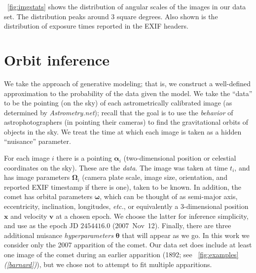 \documentclass[12pt,preprint]{aastex}
\newcommand{\project}[1]{\textsl{#1}}
\newcommand{\An}{\project{Astrometry.net}}
\newcommand{\foreign}[1]{\emph{#1}}
\newcommand{\etc}{\foreign{etc.}}
\newcommand{\figref}[1]{\figurename~\ref{#1}}
\newcommand{\paramvector}[1]{\boldsymbol{#1}}
\newcommand{\pointing}{\paramvector{\alpha}}
\newcommand{\fovpars}{\paramvector{\Omega}}
\newcommand{\orbitpars}{\paramvector{\omega}}
\newcommand{\hyperpars}{\paramvector{\theta}}
\newcommand{\position}{\paramvector{x}}
\newcommand{\velocity}{\paramvector{v}}
\newcommand{\tlabel}[1]{\textsl{({#1})}}
\begin{document}
\figref{fig:imgstats} shows the distribution of angular scales
of the images in our data set.  The distribution peaks around $3$
square degrees.  Also shown is the distribution of exposure times
reported in the EXIF headers.

\section{Orbit inference}

We take the approach of generative modeling; that is, we construct a
well-defined approximation to the probability of the data given the
model.  We take the ``data'' to be the pointing (on the sky) of each
astrometrically calibrated image (as determined by \An); recall that
the goal is to use the \emph{behavior} of astrophotographers (in
pointing their cameras) to find the gravitational orbits of objects in
the sky.  We treat the time at which each image is taken as a hidden
``nuisance'' parameter.

For each image $i$ there is a pointing $\pointing_i$ (two-dimensional
position or celestial coordinates on the sky).  These are the
\emph{data}.  The image was taken at time $t_i$, and has image
parameters $\fovpars_i$ (camera plate scale, image size, orientation,
and reported EXIF timestamp if there is one), taken to be known.  In
addition, the comet has orbital parameters $\orbitpars$, which can be
thought of as semi-major axis, eccentricity, inclination, longitudes,
\etc, or equivalently a 3-dimensional position $\position$ and
velocity $\velocity$ at a chosen epoch.  We choose the latter for
inference simplicity, and use as the epoch JD $2454416.0$
(2007~Nov~12).  Finally, there are three additional nuisance
\emph{hyperparameters} $\hyperpars$ that will appear as we go.  In
this work we consider only the 2007 apparition of the comet.  Our data
set does include at least one image of the comet during an earlier
apparition (1892; see \figref{fig:examples}\tlabel{\ref{barnard}}),
but we chose not to attempt to fit multiple apparitions.
\end{document}
